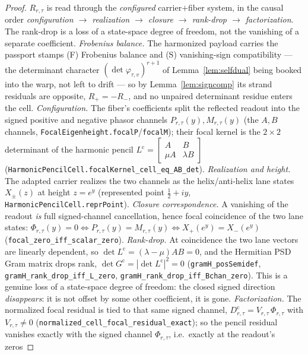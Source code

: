 \documentclass[11pt]{article}
\theoremstyle{definition}
\begin{document}
\begin{proof}
$R_{r,\tau}$ is read through the \emph{configured} carrier$+$fiber system, in the causal order
\emph{configuration $\to$ realization $\to$ closure $\to$ rank-drop $\to$ factorization}. The rank-drop is a
loss of a state-space degree of freedom, not the vanishing of a separate coefficient.
\emph{Frobenius balance.} The harmonized payload carries the passport stamps (F) Frobenius balance and
(S) vanishing-sign compatibility --- the determinant character $(\det\varphi_{\tau,v})^{r+1}$ of
Lemma~\ref{lem:selfdual} being booked into the warp, not left to drift --- so by
Lemma~\ref{lem:signcomp} its strand residuals are opposite, $R_+=-R_-$, and no unpaired determinant residue
enters the cell.
\emph{Configuration.} The fiber's coefficients split the reflected readout into the signed positive and
negative phasor channels $P_{r,\tau}(y),M_{r,\tau}(y)$ (the $A,B$ channels,
\texttt{FocalEigenheight.focalP}/\texttt{focalM}); their focal kernel is the $2\times2$ determinant of the
harmonic pencil $L^{\mathrm c}=\left[\begin{smallmatrix}A&B\\ \mu A&\lambda B\end{smallmatrix}\right]$
(\texttt{HarmonicPencilCell.focalKernel\_cell\_eq\_AB\_det}).
\emph{Realization and height.} The adapted carrier realizes the two channels as the helix/anti-helix lane
states $X_{\pm}(z)$ at height $z=e^{y}$ (represented point $\tfrac12+iy$, \texttt{HarmonicPencilCell.reprPoint}).
\emph{Closure correspondence.} A vanishing of the readout \emph{is} full signed-channel cancellation, hence
focal coincidence of the two lane states:
$\Phi_{r,\tau}(y)=0\iff P_{r,\tau}(y)=M_{r,\tau}(y)\iff X_{+}(e^{y})=X_{-}(e^{y})$
(\texttt{focal\_zero\_iff\_scalar\_zero}).
\emph{Rank-drop.} At coincidence the two lane vectors are linearly dependent, so
$\det L^{\mathrm c}=(\lambda-\mu)AB=0$, and the Hermitian PSD Gram matrix drops rank,
$\det G^{\mathrm c}=|\det L^{\mathrm c}|^{2}=0$ (\texttt{gramH\_posSemidef},
\texttt{gramH\_rank\_drop\_iff\_L\_zero}, \texttt{gramH\_rank\_drop\_iff\_Bchan\_zero}). This is a genuine
loss of a state-space degree of freedom: the closed signed direction \emph{disappears}: it is not offset by
some other coefficient, it is gone.
\emph{Factorization.} The normalized focal residual is tied to that same signed channel,
$D^{\mathrm c}_{r,\tau}=V_{r,\tau}\,\Phi_{r,\tau}$ with $V_{r,\tau}\neq0$
(\texttt{normalized\_cell\_focal\_residual\_exact}); so the pencil residual vanishes exactly with the
signed channel $\Phi_{r,\tau}$, i.e.\ exactly at the readout's zeros

\end{proof}
\end{document}
